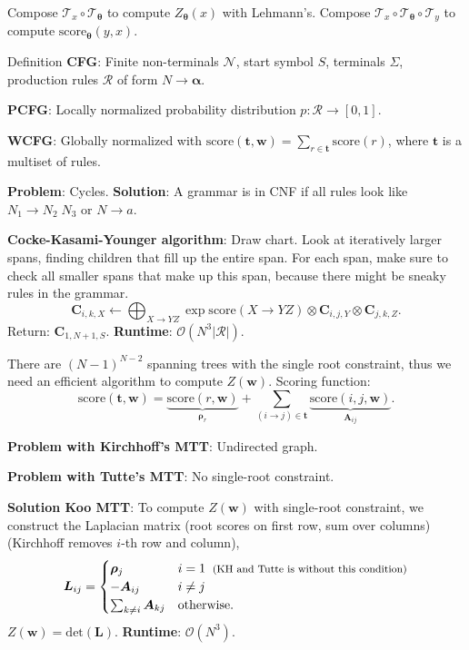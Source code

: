 \documentclass{article}
\def\score{\mathrm{score}}
\newenvironment{topic}[1]
{\begin{tcolorbox}[
  title=#1,
  breakable,
  colback=white,
  colframe=black,
  fonttitle={\bfseries\sffamily},
  sharp corners,
  boxrule=0.5pt,
  boxsep=0.1cm,
  top=0cm,
  bottom=0cm,
  left=0.1cm,
  right=0.1cm,
  enhanced jigsaw,
]}
{\end{tcolorbox}}
\begin{document}
\begin{multicols}{3}
\begin{topic}{Transliteration}
  Compose $\mathcal{T}_x \circ \mathcal{T}_{\bm{\theta}}$ to compute
  $Z_{\bm{\theta}}(x)$ with Lehmann's. Compose $\mathcal{T}_x \circ
  \mathcal{T}_{\bm{\theta}} \circ \mathcal{T}_y$ to compute
  $\score_{\bm{\theta}}(y,x)$.
\end{topic}

\begin{topic}{Constituency parsing}
  Definition \textbf{CFG}: Finite non-terminals $\mathcal{N}$, start symbol
  $S$, terminals $\Sigma$, production rules $\mathcal{R}$ of form $N \to
  \bm{\alpha}$.

  \textbf{PCFG}: Locally normalized probability distribution
  $p:\mathcal{R}\to[0,1]$.

  \textbf{WCFG}: Globally normalized with $\score(\bm{t},\bm{w}) =
  \sum_{r\in\bm{t}} \score(r)$, where $\bm{t}$ is a multiset of rules.

  \textbf{Problem}: Cycles. \textbf{Solution}: A grammar is in CNF if all rules
  look like $N_1 \to N_2 \; N_3$ or $N \to a$.

  \textbf{Cocke-Kasami-Younger algorithm}: Draw chart. Look at iteratively
  larger spans, finding children that fill up the entire span. For each span,
  make sure to check all smaller spans that make up this span, because there
  might be sneaky rules in the grammar. \[
    \bm{C}_{i,k,X} \gets \bigoplus_{X\to YZ} \exp \score(X\to YZ) \otimes \bm{C}_{i,j,Y} \otimes \bm{C}_{j,k,Z}
  .\]
  Return: $\bm{C}_{1,N+1,S}$. \textbf{Runtime}: $\mathcal{O}(N^3
  |\mathcal{R}|)$.
\end{topic}

\begin{topic}{Dependency parsing}
  There are $(N-1)^{N-2}$ spanning trees with the single root constraint, thus
  we need an efficient algorithm to compute $Z(\bm{w})$. Scoring
  function: \[
    \score(\bm{t},\bm{w}) = \underbrace{\score(r,\bm{w})}_{\bm{\rho}_r} + \sum_{(i\to j)\in\bm{t}} \underbrace{\score(i,j,\bm{w})}_{\bm{A}_{ij}}
  .\]

  \textbf{Problem with Kirchhoff's MTT}: Undirected graph.

  \textbf{Problem with Tutte's MTT}: No single-root constraint.

  \textbf{Solution Koo MTT}: To compute $Z(\bm{w})$ with single-root
  constraint, we construct the Laplacian matrix (root scores on first row, sum
  over columns) (Kirchhoff removes $i$-th row and column), \[
    \bm{L}_{ij} = \begin{cases}
      \bm{\rho}_j & i = 1 \;\; \text{\footnotesize (KH and Tutte is without this condition)} \\
      -\bm{A}_{ij} & i \neq j \\
      \sum_{k \neq i} \bm{A}_{kj} & \mathrm{otherwise}.
    \end{cases}
  \]
  $Z(\bm{w}) = \mathrm{det}(\bm{L})$. \textbf{Runtime}:
  $\mathcal{O}(N^3)$.


\end{topic}
\end{multicols}
\end{document}
